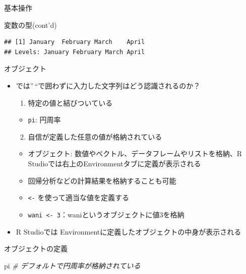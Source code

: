 \documentclass[
  ignorenonframetext,
]{beamer}
\newenvironment{Shaded}{\begin{snugshade}}{\end{snugshade}}
\newcommand{\CommentTok}[1]{\textcolor[rgb]{0.56,0.35,0.01}{\textit{#1}}}
\newcommand{\NormalTok}[1]{#1}
\providecommand{\tightlist}{%
  \setlength{\itemsep}{0pt}\setlength{\parskip}{0pt}}
\begin{document}
\begin{frame}[fragile]{基本操作}
\begin{block}{変数の型(cont'd)}
\begin{verbatim}
## [1] January  February March    April   
## Levels: January February March April
\end{verbatim}
\end{block}

\begin{block}{オブジェクト}
\protect\hypertarget{ux30aaux30d6ux30b8ux30a7ux30afux30c8}{}
\begin{itemize}
\tightlist
\item
  では''\,``で囲わずに入力した文字列はどう認識されるのか？

  \begin{enumerate}
  \tightlist
  \item
    特定の値と結びついている
  \end{enumerate}

  \begin{itemize}
  \tightlist
  \item
    \texttt{pi}: 円周率
  \end{itemize}

  \begin{enumerate}
  \setcounter{enumi}{1}
  \tightlist
  \item
    自信が定義した任意の値が格納されている
  \end{enumerate}

  \begin{itemize}
  \tightlist
  \item
    オブジェクト: 数値やベクトル、データフレームやリストを格納、R
    Studioでは右上のEnvironmentタブに定義が表示される
  \item
    回帰分析などの計算結果を格納することも可能
  \item
    \texttt{\textless{}-} を使って適当な値を定義する
  \item
    \texttt{wani\ \textless{}-\ 3}：waniというオブジェクトに値3を格納
  \end{itemize}
\item
  R Studioでは Environmentに定義したオブジェクトの中身が表示される
\end{itemize}
\end{block}

\begin{block}{オブジェクトの定義}
\protect\hypertarget{ux30aaux30d6ux30b8ux30a7ux30afux30c8ux306eux5b9aux7fa9}{}
\begin{Shaded}
\begin{Highlighting}[]
\NormalTok{pi }\CommentTok{\# デフォルトで円周率が格納されている}
\end{Highlighting}
\end{Shaded}


\end{block}
\end{frame}
\end{document}
